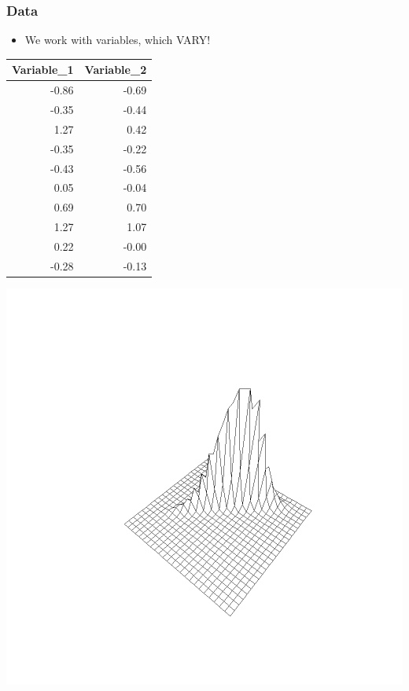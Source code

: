 \documentclass[xcolor=x11names,compress]{beamer}\usepackage[]{graphicx}\usepackage[]{color}
\makeatletter
\def\maxwidth{ %
  \ifdim\Gin@nat@width>\linewidth
    \linewidth
  \else
    \Gin@nat@width
  \fi
}
\newenvironment{knitrout}{}{} %
\renewcommand{\(}{\begin{columns}}
\renewcommand{\)}{\end{columns}}
\newcommand{\<}[1]{\begin{column}{#1}}
\renewcommand{\>}{\end{column}}
\makeatother
\begin{document}
\begin{frame}
\frametitle{Data}
\begin{itemize}
\item We work with variables, which VARY!
\end{itemize}
\begin{multicols}{2}
\begin{table}[ht]
\centering
\begin{tabular}{rr}
  \hline
Variable\_1 & Variable\_2 \\ 
  \hline
-0.86 & -0.69 \\ 
  -0.35 & -0.44 \\ 
  1.27 & 0.42 \\ 
  -0.35 & -0.22 \\ 
  -0.43 & -0.56 \\ 
  0.05 & -0.04 \\ 
  0.69 & 0.70 \\ 
  1.27 & 1.07 \\ 
  0.22 & -0.00 \\ 
  -0.28 & -0.13 \\ 
   \hline
\end{tabular}
\end{table}

\columnbreak
\begin{knitrout}
\color{fgcolor}
\includegraphics[width=\maxwidth]{figure/var6-1} 

\end{knitrout}
\end{multicols}
\end{frame}
\end{document}

